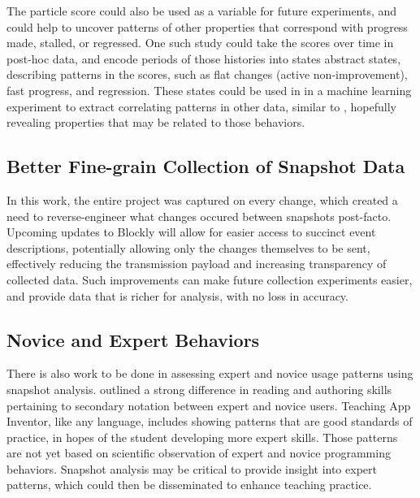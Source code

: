 The particle score could also be used as a variable for future experiments, and could help to uncover patterns of other properties that correspond with progress made, stalled, or regressed. One such study could take the scores over time in post-hoc data, and encode periods of those histories into states abstract states, describing patterns in the scores, such as flat changes (active non-improvement), fast progress, and regression. These states could be used in in a machine learning experiment to extract correlating patterns in other data, similar to \citet{tissenbaummodeling}, hopefully revealing properties that may be related to those behaviors.

\subsection{Better Fine-grain Collection of Snapshot Data} 
In this work, the entire project was captured on every change, which created a need to reverse-engineer what changes occured between snapshots post-facto. Upcoming updates to Blockly will allow for easier access to succinct event descriptions, potentially allowing only the changes themselves to be sent, effectively reducing the transmission payload and increasing transparency of collected data. Such improvements can make future collection experiments easier, and provide data that is richer for analysis, with no loss in accuracy. 

\subsection{Novice and Expert Behaviors}
There is also work to be done in assessing expert and novice usage patterns using snapshot analysis. \cite{petre-1995} outlined a strong difference in reading and authoring skills pertaining to secondary notation between expert and novice users. Teaching App Inventor, like any language, includes showing patterns that are good standards of practice, in hopes of the student developing more expert skills. Those patterns are not yet based on scientific observation of expert and novice programming behaviors. Snapshot analysis may be critical to provide insight into expert patterns, which could then be disseminated to enhance teaching practice. 

